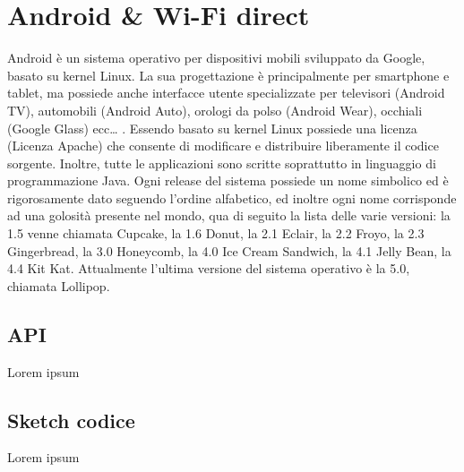 \chapter{Android & Wi-Fi direct}

Android è un sistema operativo per dispositivi mobili sviluppato da Google, basato su kernel Linux.
La sua progettazione è principalmente per smartphone e tablet, ma possiede anche interfacce utente specializzate per televisori (Android TV), automobili (Android  Auto), orologi da polso (Android Wear), occhiali (Google Glass) ecc… .
Essendo basato su kernel Linux possiede una licenza (Licenza Apache) che consente di modificare e distribuire liberamente il codice sorgente. 
Inoltre, tutte le applicazioni sono scritte soprattutto in linguaggio di programmazione Java.
Ogni release del sistema possiede un nome simbolico ed è rigorosamente dato seguendo l'ordine alfabetico, ed inoltre ogni nome corrisponde ad una golosità presente nel mondo, qua di seguito la lista delle varie versioni: la 1.5 venne chiamata Cupcake, la 1.6 Donut, la 2.1 Eclair, la 2.2 Froyo, la 2.3 Gingerbread, la 3.0 Honeycomb, la 4.0 Ice Cream Sandwich, la 4.1 Jelly Bean, la 4.4 Kit Kat. 
Attualmente l’ultima versione del sistema operativo è la 5.0, chiamata Lollipop.


\section{API}
Lorem ipsum

\section{Sketch codice}
Lorem ipsum

\clearpage{\pagestyle{empty}\cleardoublepage}